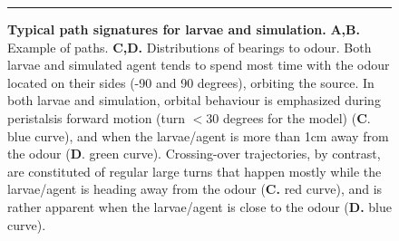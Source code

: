 \documentclass[11pt,a4paper]{article}
\begin{document}
%


\begin{figure}[ht!]
\begin{center}
\caption{{\bf Typical path signatures for larvae and simulation.} {\bf A,B.} Example of paths. {\bf C,D.} Distributions of bearings to odour.
 Both larvae and simulated agent tends to spend most time with the odour located on their sides (-90 and 90 degrees), orbiting the source. In both larvae and simulation, orbital behaviour is emphasized during peristalsis forward motion (turn $<30$ degrees for the model) ({\bf C}. blue curve), and when the larvae/agent is more than 1cm away from the odour ({\bf D}. green curve). Crossing-over trajectories, by contrast, are constituted of regular large turns that happen mostly while the larvae/agent is heading away from the odour ({\bf C.} red curve), and is rather apparent when the larvae/agent is close to the odour ({\bf D.} blue curve).
\label{fig:PathSignatures}}
\hrule
\end{center}
\end{figure}
\end{document}
